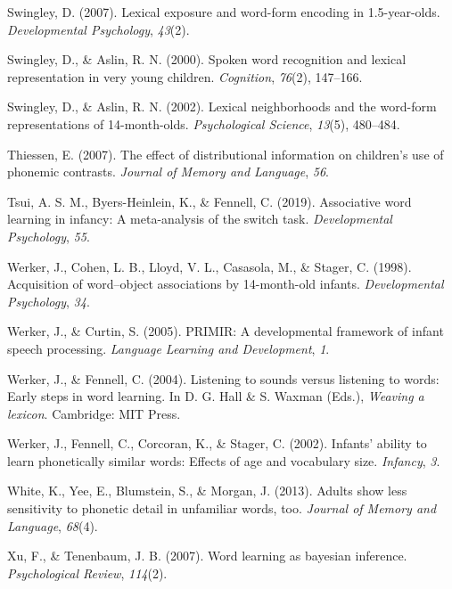 \documentclass[english,,man]{apa6}
\begin{document}
\leavevmode\hypertarget{ref-swingley2007}{}%
Swingley, D. (2007). Lexical exposure and word-form encoding in 1.5-year-olds. \emph{Developmental Psychology}, \emph{43}(2).

\leavevmode\hypertarget{ref-swingley2000}{}%
Swingley, D., \& Aslin, R. N. (2000). Spoken word recognition and lexical representation in very young children. \emph{Cognition}, \emph{76}(2), 147--166.

\leavevmode\hypertarget{ref-swingley2002}{}%
Swingley, D., \& Aslin, R. N. (2002). Lexical neighborhoods and the word-form representations of 14-month-olds. \emph{Psychological Science}, \emph{13}(5), 480--484.

\leavevmode\hypertarget{ref-thiessen2007}{}%
Thiessen, E. (2007). The effect of distributional information on children's use of phonemic contrasts. \emph{Journal of Memory and Language}, \emph{56}.

\leavevmode\hypertarget{ref-tsui2019}{}%
Tsui, A. S. M., Byers-Heinlein, K., \& Fennell, C. (2019). Associative word learning in infancy: A meta-analysis of the switch task. \emph{Developmental Psychology}, \emph{55}.

\leavevmode\hypertarget{ref-werker1998}{}%
Werker, J., Cohen, L. B., Lloyd, V. L., Casasola, M., \& Stager, C. (1998). Acquisition of word--object associations by 14-month-old infants. \emph{Developmental Psychology}, \emph{34}.

\leavevmode\hypertarget{ref-werker2005}{}%
Werker, J., \& Curtin, S. (2005). PRIMIR: A developmental framework of infant speech processing. \emph{Language Learning and Development}, \emph{1}.

\leavevmode\hypertarget{ref-werker2004}{}%
Werker, J., \& Fennell, C. (2004). Listening to sounds versus listening to words: Early steps in word learning. In D. G. Hall \& S. Waxman (Eds.), \emph{Weaving a lexicon}. Cambridge: MIT Press.

\leavevmode\hypertarget{ref-werker2002}{}%
Werker, J., Fennell, C., Corcoran, K., \& Stager, C. (2002). Infants' ability to learn phonetically similar words: Effects of age and vocabulary size. \emph{Infancy}, \emph{3}.

\leavevmode\hypertarget{ref-white2013}{}%
White, K., Yee, E., Blumstein, S., \& Morgan, J. (2013). Adults show less sensitivity to phonetic detail in unfamiliar words, too. \emph{Journal of Memory and Language}, \emph{68}(4).

\leavevmode\hypertarget{ref-xu2007}{}%
Xu, F., \& Tenenbaum, J. B. (2007). Word learning as bayesian inference. \emph{Psychological Review}, \emph{114}(2).
\end{document}
